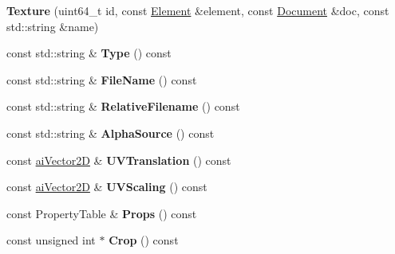 \begin{DoxyCompactItemize}
\item 
\hypertarget{class_assimp_1_1_f_b_x_1_1_texture_a1523aa65a670aa0eebad0173ff7ee861}{{\bfseries Texture} (uint64\+\_\+t id, const \hyperlink{class_assimp_1_1_f_b_x_1_1_element}{Element} \&element, const \hyperlink{class_assimp_1_1_f_b_x_1_1_document}{Document} \&doc, const std\+::string \&name)}\label{class_assimp_1_1_f_b_x_1_1_texture_a1523aa65a670aa0eebad0173ff7ee861}

\item 
\hypertarget{class_assimp_1_1_f_b_x_1_1_texture_a02b2503ae65c2915bd5ed5563ab05dfe}{const std\+::string \& {\bfseries Type} () const }\label{class_assimp_1_1_f_b_x_1_1_texture_a02b2503ae65c2915bd5ed5563ab05dfe}

\item 
\hypertarget{class_assimp_1_1_f_b_x_1_1_texture_aaac5fd5ef13267f0d2799d1a1a98d425}{const std\+::string \& {\bfseries File\+Name} () const }\label{class_assimp_1_1_f_b_x_1_1_texture_aaac5fd5ef13267f0d2799d1a1a98d425}

\item 
\hypertarget{class_assimp_1_1_f_b_x_1_1_texture_aea4eabf184f83170d532020e8c9d30ae}{const std\+::string \& {\bfseries Relative\+Filename} () const }\label{class_assimp_1_1_f_b_x_1_1_texture_aea4eabf184f83170d532020e8c9d30ae}

\item 
\hypertarget{class_assimp_1_1_f_b_x_1_1_texture_a682a0baba21eb31501a921c10c65dd2d}{const std\+::string \& {\bfseries Alpha\+Source} () const }\label{class_assimp_1_1_f_b_x_1_1_texture_a682a0baba21eb31501a921c10c65dd2d}

\item 
\hypertarget{class_assimp_1_1_f_b_x_1_1_texture_a6367406fb073e9c97649af223f77d42e}{const \hyperlink{structai_vector2_d}{ai\+Vector2\+D} \& {\bfseries U\+V\+Translation} () const }\label{class_assimp_1_1_f_b_x_1_1_texture_a6367406fb073e9c97649af223f77d42e}

\item 
\hypertarget{class_assimp_1_1_f_b_x_1_1_texture_a78938f26c8822811da24dd276ef8a9f8}{const \hyperlink{structai_vector2_d}{ai\+Vector2\+D} \& {\bfseries U\+V\+Scaling} () const }\label{class_assimp_1_1_f_b_x_1_1_texture_a78938f26c8822811da24dd276ef8a9f8}

\item 
\hypertarget{class_assimp_1_1_f_b_x_1_1_texture_ae4973d18eb38700bfedcec63355d41f3}{const Property\+Table \& {\bfseries Props} () const }\label{class_assimp_1_1_f_b_x_1_1_texture_ae4973d18eb38700bfedcec63355d41f3}

\item 
\hypertarget{class_assimp_1_1_f_b_x_1_1_texture_aef9bd367fc46d555a6a9a7389e5c5fe6}{const unsigned int $\ast$ {\bfseries Crop} () const }\label{class_assimp_1_1_f_b_x_1_1_texture_aef9bd367fc46d555a6a9a7389e5c5fe6}

\end{DoxyCompactItemize}
